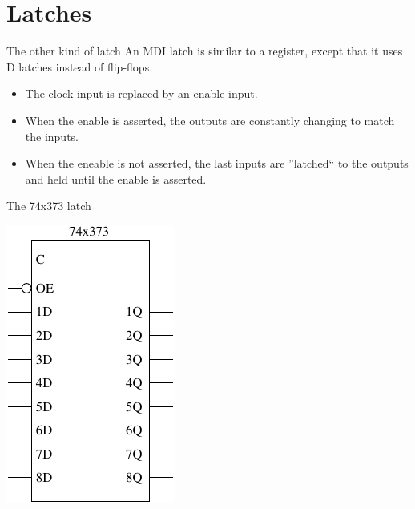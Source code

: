 \section{Latches}

\begin{frame}{The other kind of latch}
  An MDI \alert{latch} is similar to a register, except that it uses D latches instead of flip-flops.
  \begin{itemize}
    \item The clock input is replaced by an enable input.
    \item When the enable is asserted, the outputs are constantly changing to match the inputs.
    \item When the eneable is not asserted, the last inputs are ''latched`` to the outputs and held until the enable is asserted.
  \end{itemize}
\end{frame}

\begin{frame}{The 74x373 latch}
  \begin{center}
    \includegraphics{74x373Schematic}
  \end{center}
\end{frame}


